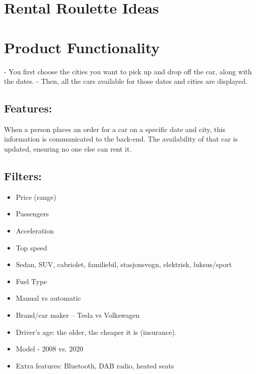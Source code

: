 \documentclass{article}
\begin{document}
\section{Rental Roulette Ideas}


\section{Product Functionality}

- You first choose the cities you want to pick up and drop off the car, along with the dates.
- Then, all the cars available for those dates and cities are displayed.

\subsection{Features:}

When a person places an order for a car on a specific date and city, this information is communicated to the back-end. The availability of that car is updated, ensuring no one else can rent it.

\subsection{Filters:}
\begin{itemize}
    \item Price (range)
    \item Passengers
    \item Acceleration
    \item Top speed
    \item Sedan, SUV, cabriolet, familiebil, stasjonsvogn, elektrisk, luksus/sport
    \item Fuel Type
    \item Manual vs automatic
    \item Brand/car maker – Tesla vs Volkswagen
    \item Driver's age: the older, the cheaper it is (insurance).
    \item Model - 2008 vs. 2020
    \item Extra features: Bluetooth, DAB radio, heated seats
\end{itemize}
\end{document}
